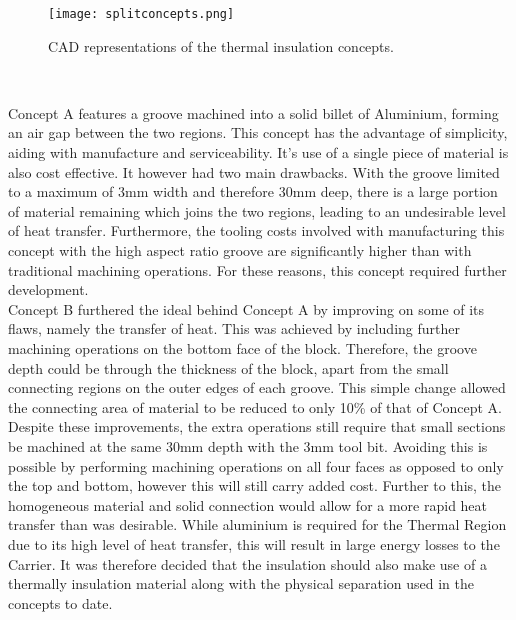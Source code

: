 \begin{figure}[!htb]
	\centering
	\texttt{[image: splitconcepts.png]}
	\caption[Thermal Insulation Concepts.]{CAD representations of the thermal insulation concepts.}
	\label{fig:splitconcepts}
\end{figure} 
\FloatBarrier

Concept A features a groove machined into a solid billet of Aluminium, forming an air gap between the two regions. This concept has the advantage of simplicity, aiding with manufacture and serviceability. It's use of a single piece of material is also cost effective. It however had two main drawbacks. With the groove limited to a maximum of 3mm width and therefore 30mm deep, there is a large portion of material remaining which joins the two regions, leading to an undesirable level of heat transfer. Furthermore, the tooling costs involved with manufacturing this concept with the high aspect ratio groove are significantly higher than with traditional machining operations. For these reasons, this concept required further development.\\

Concept B furthered the ideal behind Concept A by improving on some of its flaws, namely the transfer of heat. This was achieved by including further machining operations on the bottom face of the block. Therefore, the groove depth could be through the thickness of the block, apart from the small connecting regions on the outer edges of each groove. This simple change allowed the connecting area of material to be reduced to only 10\% of that of Concept A. Despite these improvements, the extra operations still require that small sections be machined at the same 30mm depth with the 3mm tool bit. Avoiding this is possible by performing machining operations on all four faces as opposed to only the top and bottom, however this will still carry added cost. Further to this, the homogeneous material and solid connection would allow for a more rapid heat transfer than was desirable. While aluminium is required for the Thermal Region due to its high level of heat transfer, this will result in large energy losses to the Carrier. It was therefore decided that the insulation should also make use of a thermally insulation material along with the physical separation used in the concepts to date.\\


